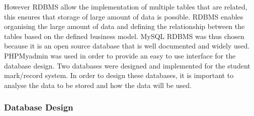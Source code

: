 However RDBMS allow the implementation of multiple tables that are related, this ensures that storage of large amount of data is possible. RDBMS enables organising the large amount of data and defining the relationship between the tables based on the defined business model. MySQL RDBMS was thus chosen because it is an open source database that is well documented and widely used\cite{ref2}. PHPMyadmin was used in order to provide an easy to use interface for the database design. Two databases were designed and implemented for the student mark/record system. In order to design these databases, it is important to analyse the data to be stored and how the data will be used.

\subsubsection{Database Design}~\\

